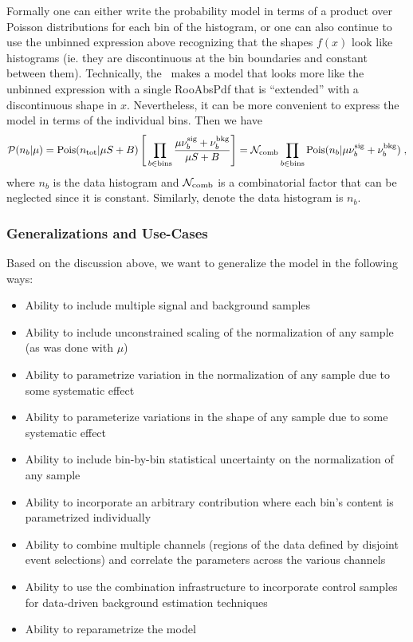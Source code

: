  Formally one can either write the probability model in terms of a product over Poisson distributions for each bin of the histogram,  or one can also continue to use the unbinned expression above recognizing that the shapes $f(x)$ look like histograms (ie. they are discontinuous at the bin boundaries and constant between them).  Technically, the \HF\ makes a model that looks more like the unbinned expression with a single RooAbsPdf that is ``extended'' with a discontinuous shape in $x$.  Nevertheless, it can be more convenient to express the model in terms of the individual bins.  Then we have
\begin{eqnarray}
{\cal P}(n_b |\mu)=  \textrm{Pois}(n_{\rm tot} | \mu S + B) \left[\, \prod_{b\in\rm bins}\frac{\mu \nu_b^{\rm sig} + \nu_b^{\rm bkg}}{\mu S + B}\right ] = \mathcal{N}_{\rm comb} \prod_{b\in\rm bins} \textrm{Pois}(n_b | \mu \nu_{b}^{\rm sig} + \nu_{b}^{\rm bkg}) \; ,
\end{eqnarray}
where $n_b$ is the data histogram and $\mathcal{N}_{\rm comb}$ is a combinatorial factor that can be neglected since it is constant.   Similarly, denote the data histogram is $n_b$. 



\subsubsection{Generalizations and Use-Cases}

Based on the discussion above, we want to generalize the model in the following ways:
\begin{itemize}
	\item Ability to include multiple signal and background samples
	\item Ability to include unconstrained scaling of the normalization of any sample (as was done with $\mu$)
	\item Ability to parametrize variation in the normalization of any sample due to some systematic effect
	\item Ability to parameterize variations in the shape of any sample due to some systematic effect
	\item Ability to include bin-by-bin statistical uncertainty on the normalization of any sample
	\item Ability to incorporate an arbitrary contribution where each bin's content is parametrized individually
	\item Ability to combine multiple channels (regions of the data defined by disjoint event selections) and correlate the parameters across the various channels
	\item Ability to use the combination infrastructure to incorporate control samples for data-driven background estimation techniques
	\item Ability to reparametrize the model 
\end{itemize}


